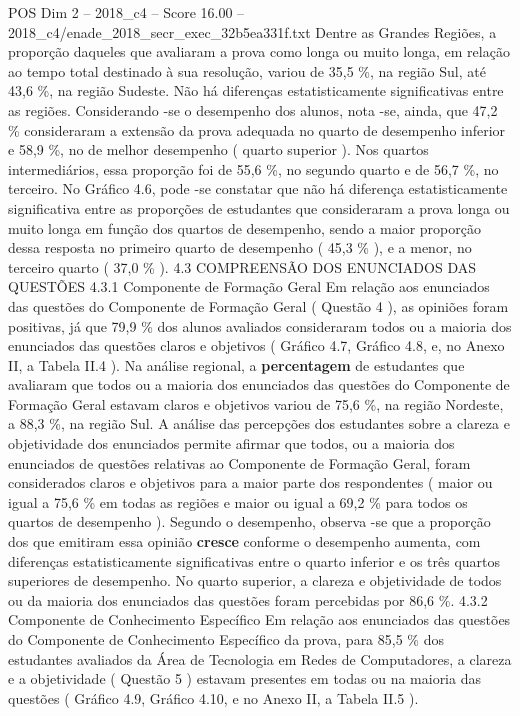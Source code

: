 \begin{textsample}{POS Dim 2 – 2018\_c4 – Score 16.00 – 2018\_c4/enade\_2018\_secr\_exec\_32b5ea331f.txt}
Dentre as Grandes Regiões, a proporção daqueles que avaliaram a prova como longa ou muito longa, em relação ao tempo total destinado à sua resolução, variou de 35,5 \%, na região Sul, até 43,6 \%, na região Sudeste.
Não há diferenças estatisticamente significativas entre as regiões.
Considerando -se o desempenho dos alunos, nota -se, ainda, que 47,2 \% consideraram a extensão da prova adequada no quarto de desempenho inferior e 58,9 \%, no de melhor desempenho ( quarto superior ).
Nos quartos intermediários, essa proporção foi de 55,6 \%, no segundo quarto e de 56,7 \%, no terceiro.
No Gráfico 4.6, pode -se constatar que não há diferença estatisticamente significativa entre as proporções de estudantes que consideraram a prova longa ou muito longa em função dos quartos de desempenho, sendo a maior proporção dessa resposta no primeiro quarto de desempenho ( 45,3 \% ), e a menor, no terceiro quarto ( 37,0 \% ). 4.3 COMPREENSÃO DOS ENUNCIADOS DAS QUESTÕES 4.3.1 Componente de Formação Geral Em relação aos enunciados das questões do Componente de Formação Geral ( Questão 4 ), as opiniões foram positivas, já que 79,9 \% dos alunos avaliados consideraram todos ou a maioria dos enunciados das questões claros e objetivos ( Gráfico 4.7, Gráfico 4.8, e, no Anexo II, a Tabela II.4 ).
Na análise regional, a \textbf{percentagem} de estudantes que avaliaram que todos ou a maioria dos enunciados das questões do Componente de Formação Geral estavam claros e objetivos variou de 75,6 \%, na região Nordeste, a 88,3 \%, na região Sul.
A análise das percepções dos estudantes sobre a clareza e objetividade dos enunciados permite afirmar que todos, ou a maioria dos enunciados de questões relativas ao Componente de Formação Geral, foram considerados claros e objetivos para a maior parte dos respondentes ( maior ou igual a 75,6 \% em todas as regiões e maior ou igual a 69,2 \% para todos os quartos de desempenho ).
Segundo o desempenho, observa -se que a proporção dos que emitiram essa opinião \textbf{cresce} conforme o desempenho aumenta, com diferenças estatisticamente significativas entre o quarto inferior e os três quartos superiores de desempenho.
No quarto superior, a clareza e objetividade de todos ou da maioria dos enunciados das questões foram percebidas por 86,6 \%. 4.3.2 Componente de Conhecimento Específico Em relação aos enunciados das questões do Componente de Conhecimento Específico da prova, para 85,5 \% dos estudantes avaliados da Área de Tecnologia em Redes de Computadores, a clareza e a objetividade ( Questão 5 ) estavam presentes em todas ou na maioria das questões ( Gráfico 4.9, Gráfico 4.10, e no Anexo II, a Tabela II.5 ).

\end{textsample}
